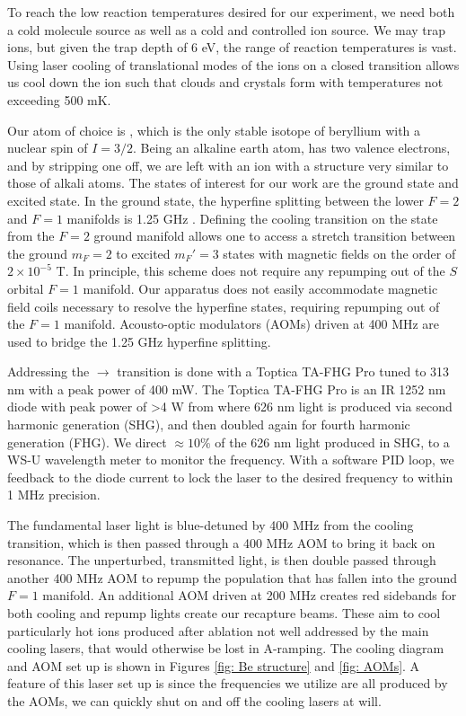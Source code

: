 To reach the low reaction temperatures desired for our experiment, we need both a cold molecule source as well as a cold and controlled ion source. We may trap  ions, but given the trap depth of 6 eV, the range of reaction temperatures is vast. Using laser cooling of translational modes of the ions on a closed transition allows us cool down the ion such that clouds and crystals form with temperatures not exceeding 500 mK.\cite{Wineland1979}

Our atom of choice is , which is the only stable isotope of beryllium with a nuclear spin of $I=3/2$. Being an alkaline earth atom,  has two valence electrons, and by stripping one off, we are left with an ion with a structure very similar to those of alkali atoms. The states of interest for our work are the  ground state and  excited state. In the ground state, the hyperfine splitting between the lower $F=2$ and $F=1$ manifolds is 1.25 GHz \cite{Bollinger1985}. Defining the cooling transition on the  state from the $F=2$ ground manifold allows one to access a stretch transition between the ground $m_F=2$ to excited $m_F'=3$ states with magnetic fields on the order of $2 \times 10^{-5}$ T.\cite{Langer2006} In principle, this scheme does not require any repumping out of the $S$ orbital $F=1$ manifold. Our apparatus does not easily accommodate magnetic field coils necessary to resolve the hyperfine states, requiring repumping out of the $F=1$ manifold. Acousto-optic modulators (AOMs) driven at 400 MHz are used to bridge the 1.25 GHz hyperfine splitting.

Addressing the $\rightarrow$ transition is done with a Toptica TA-FHG Pro tuned to 313 nm with a peak power of 400 mW. The Toptica TA-FHG Pro is an IR 1252 nm diode with peak power of >4 W from where 626 nm light is produced via second harmonic generation (SHG), and then doubled again for fourth harmonic generation (FHG). We direct $\approx 10\%$ of the 626 nm light produced in SHG, to a WS-U wavelength meter to monitor the frequency. With a software PID loop, we feedback to the diode current to lock the laser to the desired frequency to within 1 MHz precision.

The fundamental laser light is blue-detuned by 400 MHz from the cooling transition, which is then passed through a 400 MHz AOM to bring it back on resonance. The unperturbed, transmitted light, is then double passed through another 400 MHz AOM to repump the population that has fallen into the ground $F=1$ manifold. An additional AOM driven at 200 MHz creates red sidebands for both cooling and repump lights create our recapture beams. These aim to cool particularly hot  ions produced after ablation not well addressed by the main cooling lasers, that would otherwise be lost in A-ramping. The  cooling diagram and AOM set up is shown in Figures \ref{fig: Be structure} and \ref{fig: AOMs}. A feature of this laser set up is since the frequencies we utilize are all produced by the AOMs, we can quickly shut on and off the cooling lasers at will.

